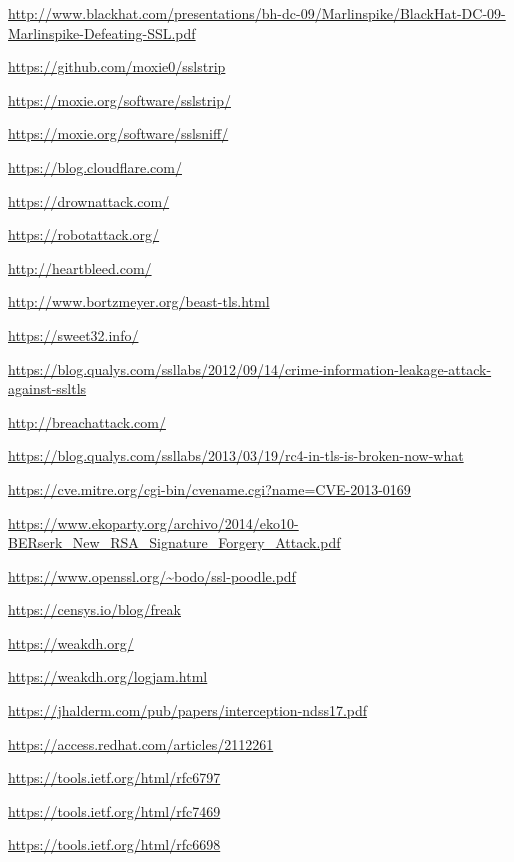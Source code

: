 \begin{thebibliography}{4}

  \url{http://www.blackhat.com/presentations/bh-dc-09/Marlinspike/BlackHat-DC-09-Marlinspike-Defeating-SSL.pdf}

  \url{https://github.com/moxie0/sslstrip}

  \url{https://moxie.org/software/sslstrip/}

  \url{https://moxie.org/software/sslsniff/}

  \url{https://blog.cloudflare.com/}

  \url{https://drownattack.com/}

  \url{https://robotattack.org/}

  \url{http://heartbleed.com/}

  \url{http://www.bortzmeyer.org/beast-tls.html}

  \url{https://sweet32.info/}

  \url{https://blog.qualys.com/ssllabs/2012/09/14/crime-information-leakage-attack-against-ssltls}

  \url{http://breachattack.com/}

  \url{https://blog.qualys.com/ssllabs/2013/03/19/rc4-in-tls-is-broken-now-what}

  \url{https://cve.mitre.org/cgi-bin/cvename.cgi?name=CVE-2013-0169}

  \url{https://www.ekoparty.org/archivo/2014/eko10-BERserk_New_RSA_Signature_Forgery_Attack.pdf}

  \url{https://www.openssl.org/~bodo/ssl-poodle.pdf}

  \url{https://censys.io/blog/freak}

  \url{https://weakdh.org/}

  \url{https://weakdh.org/logjam.html}

  \url{https://jhalderm.com/pub/papers/interception-ndss17.pdf}

  \url{https://access.redhat.com/articles/2112261}

  \url{https://tools.ietf.org/html/rfc6797}

  \url{https://tools.ietf.org/html/rfc7469}

  \url{https://tools.ietf.org/html/rfc6698}

\end{thebibliography}
